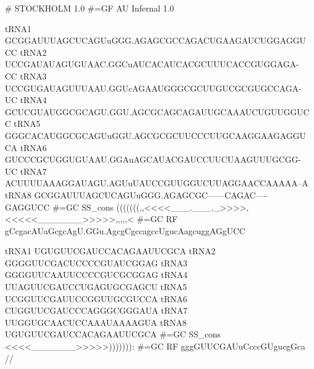 {\samepage
{}

\begin{sreoutput}
# STOCKHOLM 1.0
#=GF AU Infernal 1.0

tRNA1        GCGGAUUUAGCUCAGUuGGG.AGAGCGCCAGACUGAAGAUCUGGAGGUCC
tRNA2        UCCGAUAUAGUGUAAC.GGCuAUCACAUCACGCUUUCACCGUGGAGA-CC
tRNA3        UCCGUGAUAGUUUAAU.GGUcAGAAUGGGCGCUUGUCGCGUGCCAGA-UC
tRNA4        GCUCGUAUGGCGCAGU.GGU.AGCGCAGCAGAUUGCAAAUCUGUUGGUCC
tRNA5        GGGCACAUGGCGCAGUuGGU.AGCGCGCUUCCCUUGCAAGGAAGAGGUCA
tRNA6        GUCCCGCUGGUGUAAU.GGAuAGCAUACGAUCCUUCUAAGUUUGCGG-UC
tRNA7        ACUUUUAAAGGAUAGU.AGUuUAUCCGUUGGUCUUAGGAACCAAAAA--A
tRNA8        GCGGAUUUAGCUCAGUuGGG.AGAGCGC------CAGAC----GAGGUCC
#=GC SS_cons (((((((,,<<<<___.___._>>>>,<<<<<_______>>>>>,,,,,<
#=GC RF      gCcgacAUaGcgcAgU.GGu.AgcgCgccagccUgucAagcuggAGgUCC

tRNA1        UGUGUUCGAUCCACAGAAUUCGCA
tRNA2        GGGGUUCGACUCCCCGUAUCGGAG
tRNA3        GGGGUUCAAUUCCCCGUCGCGGAG
tRNA4        UUAGUUCGAUCCUGAGUGCGAGCU
tRNA5        UCGGUUCGAUUCCGGUUGCGUCCA
tRNA6        CUGGUUCGAUCCCAGGGCGGGAUA
tRNA7        UUGGUGCAACUCCAAAUAAAAGUA
tRNA8        UGUGUUCGAUCCACAGAAUUCGCA
#=GC SS_cons <<<<_______>>>>>))))))):
#=GC RF      gggGUUCGAUuCcccGUgucgGca
//
\end{sreoutput}
}


